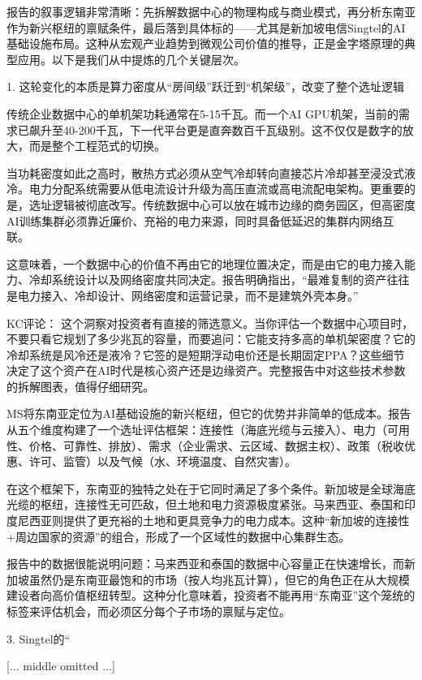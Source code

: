 \documentclass[11pt]{ctexart}
\begin{document}
报告的叙事逻辑非常清晰：先拆解数据中心的物理构成与商业模式，再分析东南亚作为新兴枢纽的禀赋条件，最后落到具体标的——尤其是新加坡电信Singtel的AI基础设施布局。这种从宏观产业趋势到微观公司价值的推导，正是金字塔原理的典型应用。以下是我们从中提炼的几个关键层次。

1. 这轮变化的本质是算力密度从“房间级”跃迁到“机架级”，改变了整个选址逻辑

传统企业数据中心的单机架功耗通常在5-15千瓦。而一个AI GPU机架，当前的需求已飙升至40-200千瓦，下一代平台更是直奔数百千瓦级别。这不仅仅是数字的放大，而是整个工程范式的切换。

当功耗密度如此之高时，散热方式必须从空气冷却转向直接芯片冷却甚至浸没式液冷。电力分配系统需要从低电流设计升级为高压直流或高电流配电架构。更重要的是，选址逻辑被彻底改写。传统数据中心可以放在城市边缘的商务园区，但高密度AI训练集群必须靠近廉价、充裕的电力来源，同时具备低延迟的集群内网络互联。

这意味着，一个数据中心的价值不再由它的地理位置决定，而是由它的电力接入能力、冷却系统设计以及网络密度共同决定。报告明确指出，“最难复制的资产往往是电力接入、冷却设计、网络密度和运营记录，而不是建筑外壳本身。”

KC评论： 这个洞察对投资者有直接的筛选意义。当你评估一个数据中心项目时，不要只看它规划了多少兆瓦的容量，而要追问：它能支持多高的单机架密度？它的冷却系统是风冷还是液冷？它签的是短期浮动电价还是长期固定PPA？这些细节决定了这个资产在AI时代是核心资产还是边缘资产。完整报告中对这些技术参数的拆解图表，值得仔细研究。

MS将东南亚定位为AI基础设施的新兴枢纽，但它的优势并非简单的低成本。报告从五个维度构建了一个选址评估框架：连接性（海底光缆与云接入）、电力（可用性、价格、可靠性、排放）、需求（企业需求、云区域、数据主权）、政策（税收优惠、许可、监管）以及气候（水、环境温度、自然灾害）。

在这个框架下，东南亚的独特之处在于它同时满足了多个条件。新加坡是全球海底光缆的枢纽，连接性无可匹敌，但土地和电力资源极度紧张。马来西亚、泰国和印度尼西亚则提供了更充裕的土地和更具竞争力的电力成本。这种“新加坡的连接性+周边国家的资源”的组合，形成了一个区域性的数据中心集群生态。

报告中的数据很能说明问题：马来西亚和泰国的数据中心容量正在快速增长，而新加坡虽然仍是东南亚最饱和的市场（按人均兆瓦计算），但它的角色正在从大规模建设者向高价值枢纽转型。这种分化意味着，投资者不能再用“东南亚”这个笼统的标签来评估机会，而必须区分每个子市场的禀赋与定位。

3. Singtel的“

[... middle omitted ...]
\end{document}
